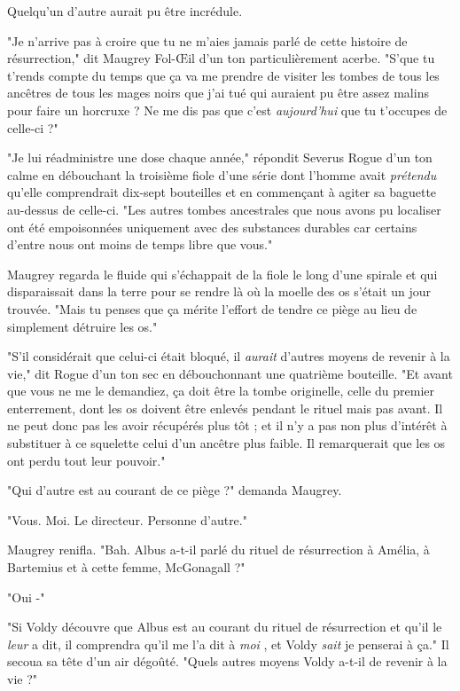 Quelqu'un d'autre aurait pu être incrédule.

"Je n'arrive pas à croire que tu ne m'aies jamais parlé de cette histoire de résurrection," dit Maugrey Fol-Œil d'un ton particulièrement acerbe. "S'que tu t'rends compte du temps que ça va me prendre de visiter les tombes de tous les ancêtres de tous les mages noirs que j'ai tué qui auraient pu être assez malins pour faire un horcruxe ? Ne me dis pas que c'est \emph{aujourd'hui}  que tu t'occupes de celle-ci ?"

"Je lui réadministre une dose chaque année," répondit Severus Rogue d'un ton calme en débouchant la troisième fiole d'une série dont l'homme avait \emph{prétendu}  qu'elle comprendrait dix-sept bouteilles et en commençant à agiter sa baguette au-dessus de celle-ci. "Les autres tombes ancestrales que nous avons pu localiser ont été empoisonnées uniquement avec des substances durables car certains d'entre nous ont moins de temps libre que vous."

Maugrey regarda le fluide qui s'échappait de la fiole le long d'une spirale et qui disparaissait dans la terre pour se rendre là où la moelle des os s'était un jour trouvée. "Mais tu penses que ça mérite l'effort de tendre ce piège au lieu de simplement détruire les os."

"S'il considérait que celui-ci était bloqué, il \emph{aurait } d'autres moyens de revenir à la vie," dit Rogue d'un ton sec en débouchonnant une quatrième bouteille. "Et avant que vous ne me le demandiez, ça doit être la tombe originelle, celle du premier enterrement, dont les os doivent être enlevés pendant le rituel mais pas avant. Il ne peut donc pas les avoir récupérés plus tôt ; et il n'y a pas non plus d'intérêt à substituer à ce squelette celui d'un ancêtre plus faible. Il remarquerait que les os ont perdu tout leur pouvoir."

"Qui d'autre est au courant de ce piège ?" demanda Maugrey.

"Vous. Moi. Le directeur. Personne d'autre."

Maugrey renifla. "Bah. Albus a-t-il parlé du rituel de résurrection à Amélia, à Bartemius et à cette femme, McGonagall ?"

"Oui -"

"Si Voldy découvre que Albus est au courant du rituel de résurrection et qu'il le \emph{leur}  a dit, il comprendra qu'il me l'a dit à \emph{moi} , et Voldy \emph{sait}  je penserai à ça." Il secoua sa tête d'un air dégoûté. "Quels autres moyens Voldy a-t-il de revenir à la vie ?"

